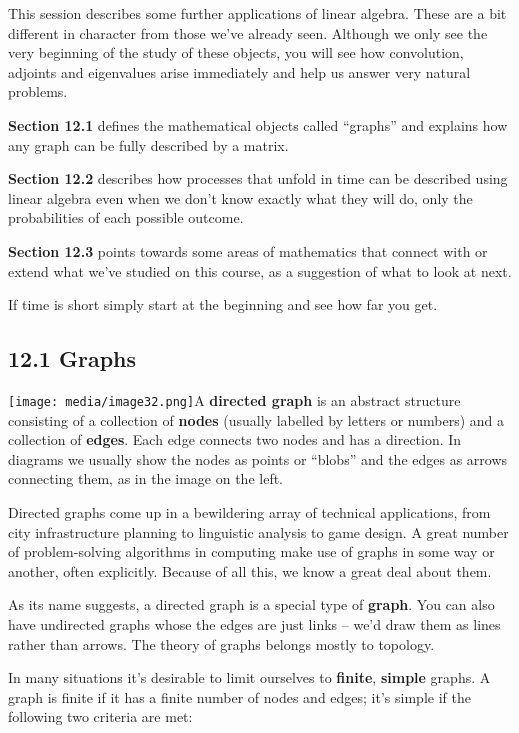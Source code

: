 \documentclass[oneside,english]{amsbook}
\numberwithin{section}{chapter}
\theoremstyle{plain}
\theoremstyle{definition}
\begin{document}
This session describes some further applications of linear algebra.
These are a bit different in character from those we've already seen.
Although we only see the very beginning of the study of these objects,
you will see how convolution, adjoints and eigenvalues arise immediately
and help us answer very natural problems.

\textbf{Section 12.1} defines the mathematical objects called ``graphs''
and explains how any graph can be fully described by a matrix.

\textbf{Section 12.2} describes how processes that unfold in time can be
described using linear algebra even when we don't know exactly what they
will do, only the probabilities of each possible outcome.

\textbf{Section 12.3} points towards some areas of mathematics that
connect with or extend what we've studied on this course, as a
suggestion of what to look at next.

If time is short simply start at the beginning and see how far you get.

\subsection{12.1 Graphs}\label{graphs}

\texttt{[image: media/image32.png]}A
\textbf{directed graph} is an abstract structure consisting of a
collection of \textbf{nodes} (usually labelled by letters or numbers)
and a collection of \textbf{edges}. Each edge connects two nodes and has
a direction. In diagrams we usually show the nodes as points or
``blobs'' and the edges as arrows connecting them, as in the image on
the left.

Directed graphs come up in a bewildering array of technical
applications, from city infrastructure planning to linguistic analysis
to game design. A great number of problem-solving algorithms in
computing make use of graphs in some way or another, often explicitly.
Because of all this, we know a great deal about them.

As its name suggests, a directed graph is a special type of
\textbf{graph}. You can also have undirected graphs whose the edges are
just links -- we'd draw them as lines rather than arrows. The theory of
graphs belongs mostly to topology.

In many situations it's desirable to limit ourselves to \textbf{finite},
\textbf{simple} graphs. A graph is finite if it has a finite number of
nodes and edges; it's simple if the following two criteria are met:
\end{document}
